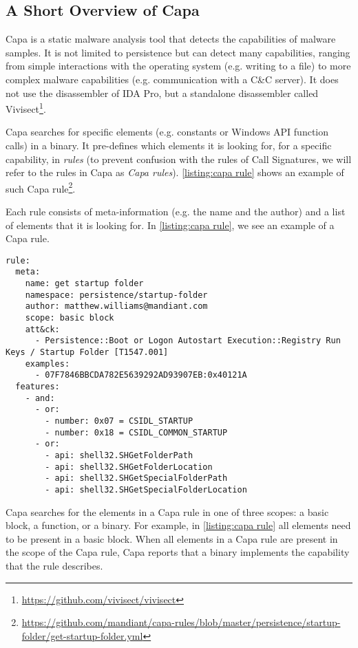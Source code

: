 \subsection{A Short Overview of Capa}
Capa is a static malware analysis tool that detects the capabilities of malware samples. It is not limited to persistence but can detect many capabilities, ranging from simple interactions with the operating system (e.g. writing to a file) to more complex malware capabilities (e.g. communication with a C\&C server). It does not use the disassembler of IDA Pro, but a standalone disassembler called Vivisect\footnote{\tiny \url{https://github.com/vivisect/vivisect}}.

Capa searches for specific elements (e.g. constants or Windows API function calls) in a binary. It pre-defines which elements it is looking for, for a specific capability, in \emph{rules} (to prevent confusion with the rules of Call Signatures, we will refer to the rules in Capa as \emph{Capa rules}). \autoref{listing:capa rule} shows an example of such Capa rule\footnote{\tiny \url{https://github.com/mandiant/capa-rules/blob/master/persistence/startup-folder/get-startup-folder.yml}}.

Each rule consists of meta-information (e.g. the name and the author) and a list of elements that it is looking for. In \autoref{listing:capa rule}, we see an example of a Capa rule.

\begin{minipage}{0.9\textwidth}
\begin{lstlisting}[label={listing:capa rule}, caption={The \texttt{get startup folder} Capa rule.}, captionpos=b]
rule:
  meta:
    name: get startup folder
    namespace: persistence/startup-folder
    author: matthew.williams@mandiant.com
    scope: basic block
    att&ck:
      - Persistence::Boot or Logon Autostart Execution::Registry Run Keys / Startup Folder [T1547.001]
    examples:
      - 07F7846BBCDA782E5639292AD93907EB:0x40121A
  features:
    - and:
      - or:
        - number: 0x07 = CSIDL_STARTUP
        - number: 0x18 = CSIDL_COMMON_STARTUP
      - or:
        - api: shell32.SHGetFolderPath
        - api: shell32.SHGetFolderLocation
        - api: shell32.SHGetSpecialFolderPath
        - api: shell32.SHGetSpecialFolderLocation
\end{lstlisting}
\end{minipage}

Capa searches for the elements in a Capa rule in one of three scopes: a basic block, a function, or a binary. For example, in \autoref{listing:capa rule} all elements need to be present in a basic block. When all elements in a Capa rule are present in the scope of the Capa rule, Capa reports that a binary implements the capability that the rule describes.

